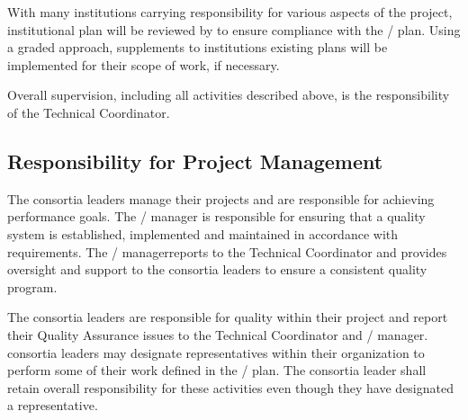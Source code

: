 With many institutions carrying responsibility for various aspects of
the project, institutional  plan will be reviewed by 
 to ensure compliance with the /  plan. Using a
graded approach, supplements to institutions existing plans will be
implemented for their  scope of work, if necessary.

Overall  supervision, including all activities described above, is
the responsibility of the  Technical Coordinator.

\subsection{Responsibility for Project Management}

The  consortia leaders manage their projects and are responsible
for achieving performance goals. The /  manager is responsible for
ensuring that a quality system is established, implemented and
maintained in accordance with requirements. The /  managerreports
to the  Technical Coordinator and provides oversight and support
to the consortia leaders to ensure a consistent quality program.

The  consortia leaders are responsible for quality within their
project and report their Quality Assurance issues to the 
Technical Coordinator and /  manager.  consortia leaders
may designate   representatives  within their
organization to perform some of their work defined in the /
 plan. The  consortia leader shall retain overall
responsibility for these activities even though they have designated a
  representative.


